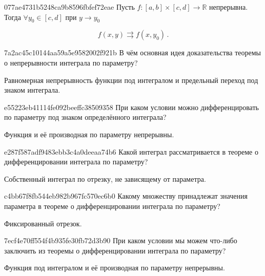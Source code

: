 \begin{note}{077ae4731b5248ca9b8596fbfef72eae}
    Пусть \({ f : [a, b] \times [c, d] \to \mathbb R }\) непрерывна.
    Тогда \({ \forall y_0 \in [c, d] }\) при \({ y \to y_0 }\)
    \begin{icloze}{1}
        \[
            f(x, y) \rightrightarrows f(x, y_0)\,.
        \]
    \end{icloze}
\end{note}

\begin{note}{7a2ac45c10144aa59a5e9582002f921b}
    В чём основная идея доказательства теоремы о непрерывности интеграла по параметру?

    \begin{cloze}{1}
        Равномерная непрерывность функции под интегралом и предельный переход под знаком интеграла.
    \end{cloze}
\end{note}

\begin{note}{e55223eb41114fe092beeffc38509358}
    При каком условии можно дифференцировать по параметру под знаком определённого интеграла?

    \begin{cloze}{1}
        Функция и её производная по параметру непрерывны.
    \end{cloze}
\end{note}

\begin{note}{e287f587adf9483ebb3c4a0deeaa74b6}
    Какой интеграл рассматривается в теореме о дифференцировании интеграла по параметру?

    \begin{cloze}{1}
        Собственный интеграл по отрезку, не зависящему от параметра.
    \end{cloze}
\end{note}

\begin{note}{c4bb67f8fb544eb982b967fc570ec6b0}
    Какому множеству принадлежат значения параметра в теореме о дифференцировании интеграла по параметру?

    \begin{cloze}{1}
        Фиксированный отрезок.
    \end{cloze}
\end{note}

\begin{note}{7ecf4e70ff554f4b935fe30fb72d3b90}
    При каком условии мы можем что-либо заключить из теоремы о дифференцировании интеграла по параметру?

    \begin{cloze}{1}
        Функция под интегралом и её производная по параметру непрерывны.
    \end{cloze}
\end{note}

